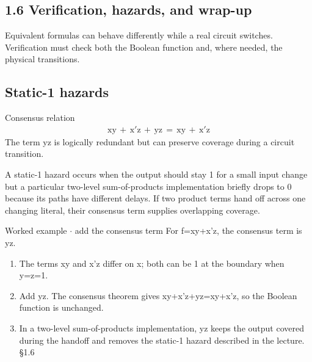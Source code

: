 \documentclass[11pt]{article}
\begin{document}
\begin{keepsection}
\section{1.6 Verification, hazards, and wrap-up}

Equivalent formulas can behave differently while a real circuit switches. Verification must check both the Boolean function and, where needed, the physical transitions.

\begin{keepsection}
\subsection{Static-1 hazards}

\begin{equationcard}{Consensus relation}
\[ \begin{gathered} \text{xy}\, +\, \mathrm{x}'\mathrm{z}\, +\, \text{yz}\, =\, \text{xy}\, +\, \mathrm{x}'\mathrm{z} \end{gathered} \]
{\small The term yz is logically redundant but can preserve coverage during a circuit transition.}
\end{equationcard}

A static-1 hazard occurs when the output should stay 1 for a small input change but a particular two-level sum-of-products implementation briefly drops to 0 because its paths have different delays. If two product terms hand off across one changing literal, their consensus term supplies overlapping coverage.

\begin{workedbox}{Worked example \ensuremath{\cdot} add the consensus term}
For f=xy+x'z, the consensus term is yz.

\begin{enumerate}
\item The terms xy and x'z differ on x; both can be 1 at the boundary when y=z=1.
\item Add yz. The consensus theorem gives xy+x'z+yz=xy+x'z, so the Boolean function is unchanged.
\item In a two-level sum-of-products implementation, yz keeps the output covered during the handoff and removes the static-1 hazard described in the lecture. \hfill{\small\color{FAUblue}§1.6}
\end{enumerate}
\end{workedbox}
\end{keepsection}


\end{keepsection}
\end{document}
